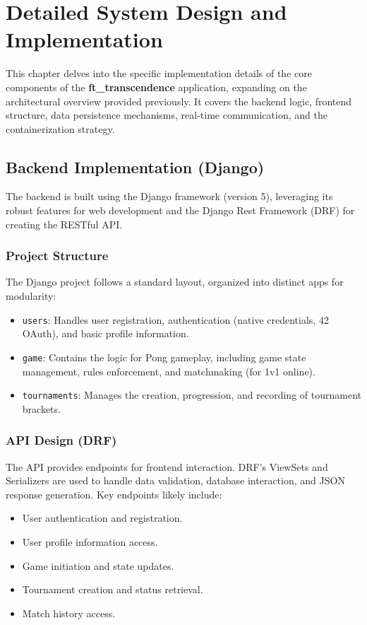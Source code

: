 
\chapter{Detailed System Design and Implementation}
\label{ch:implementation}

This chapter delves into the specific implementation details of the core components of the \textbf{ft\_transcendence} application, expanding on the architectural overview provided previously. It covers the backend logic, frontend structure, data persistence mechanisms, real-time communication, and the containerization strategy.

\section{Backend Implementation (Django)}
\label{sec:backend_impl}
The backend is built using the Django framework (version 5), leveraging its robust features for web development and the Django Rest Framework (DRF) for creating the RESTful API.

\subsection{Project Structure}
The Django project follows a standard layout, organized into distinct apps for modularity:
\begin{itemize}
    \item \texttt{users}: Handles user registration, authentication (native credentials, 42 OAuth), and basic profile information.
    \item \texttt{game}: Contains the logic for Pong gameplay, including game state management, rules enforcement, and matchmaking (for 1v1 online).
    \item \texttt{tournaments}: Manages the creation, progression, and recording of tournament brackets.
\end{itemize}

\subsection{API Design (DRF)}
The API provides endpoints for frontend interaction. DRF's ViewSets and Serializers are used to handle data validation, database interaction, and JSON response generation. Key endpoints likely include:
\begin{itemize}
    \item User authentication and registration.
    \item User profile information access.
    \item Game initiation and state updates.
    \item Tournament creation and status retrieval.
    \item Match history access.
\end{itemize}

